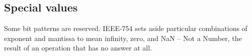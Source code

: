 
\subsection{Special values}

Some bit patterns are reserved. IEEE-754 sets aside particular combinations of
exponent and mantissa to mean infinity, zero, and NaN -- Not a Number, the result
of an operation that has no answer at all.



